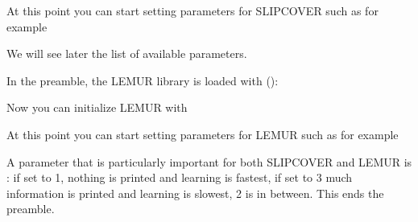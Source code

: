 \documentclass[letterpaper,10pt,english]{sphinxmanual}
\begin{document}
At this point you can start setting parameters for SLIPCOVER such as for example

\begin{sphinxVerbatim}[commandchars=\\\{\}]
 
 
 
 
\end{sphinxVerbatim}

We will see later the list of available parameters.

In the preamble, the LEMUR library is loaded with ():

\begin{sphinxVerbatim}[commandchars=\\\{\}]
 
\end{sphinxVerbatim}

Now you can initialize LEMUR with

\begin{sphinxVerbatim}[commandchars=\\\{\}]
 
\end{sphinxVerbatim}

At this point you can start setting parameters for LEMUR such as for example

\begin{sphinxVerbatim}[commandchars=\\\{\}]
 
\end{sphinxVerbatim}

A parameter that is particularly important for both SLIPCOVER and LEMUR is : if set to 1, nothing is printed and learning is fastest, if set to 3 much information is printed and learning is slowest, 2 is in between. This ends the preamble.
\end{document}
